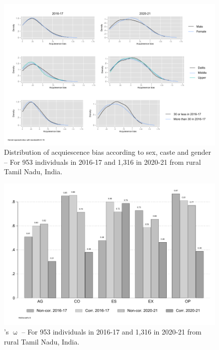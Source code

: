 \documentclass[a4paper, 12pt, onecolumn]{article}
\begin{document}
\begin{figure}[!h]
\raggedright
\includegraphics[scale=0.8]{INPUT/kernel_ars_sub}
\caption{Distribution of acquiescence bias according to sex, caste and gender -- For 953 individuals in 2016-17 and 1,316 in 2020-21 from rural Tamil Nadu, India.}
\label{fig:arssub}
\end{figure}


\begin{figure}[!h]
\raggedright
\includegraphics[scale=0.8]{INPUT/omega}
\caption{\citeauthor{McDonald1999}'s $\upomega$ -- For 953 individuals in 2016-17 and 1,316 in 2020-21 from rural Tamil Nadu, India.}
\label{fig:omega}
\end{figure}
\end{document}
